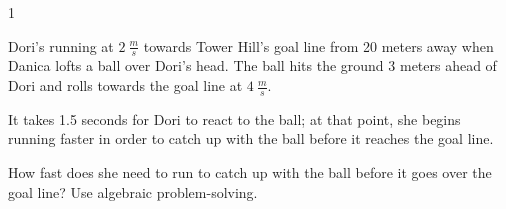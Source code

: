 
\AddToShipoutPicture*{\BackgroundPic}

\addtocounter {ProbNum} {1}

 
{\bf \Large{}} Dori's running at ${2~\tfrac{m}{s}}$ towards Tower Hill's goal line from 20 meters away when Danica lofts a ball over Dori's head.  The ball hits the ground 3 meters ahead of Dori and rolls towards the goal line at ${4~\tfrac{m}{s}}$.  

\bigskip

It takes 1.5 seconds for Dori to react to the ball; at that point, she begins running faster in order to catch up with the ball before it reaches the goal line.  

\bigskip

How fast does she need to run to catch up with the ball before it goes over the goal line? Use algebraic problem-solving.

\vfill

\newpage
